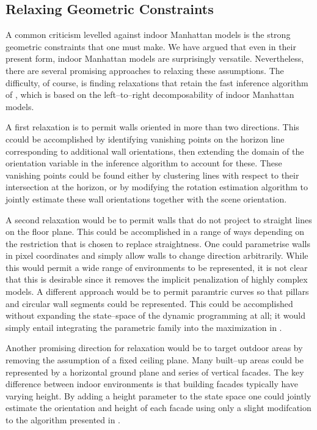 \subsection{Relaxing Geometric Constraints}

A common criticism levelled against indoor Manhattan models is the
strong geometric constraints that one must make. We have argued that
even in their present form, indoor Manhattan models are surprisingly
versatile. Nevertheless, there are several promising approaches to
relaxing these assumptions. The difficulty, of course, is finding
relaxations that retain the fast inference algorithm of
, which is based on the left--to--right
decomposability of indoor Manhattan models.

A first relaxation is to permit walls oriented in more than two
directions. This ccould be accomplished by identifying vanishing
points on the horizon line corresponding to additional wall
orientations, then extending the domain of the orientation variable in
the inference algorithm to account for these. These vanishing points
could be found either by clustering lines with respect to their
intersection at the horizon, or by modifying the rotation estimation
algorithm to jointly estimate these wall orientations together with
the scene orientation.

A second relaxation would be to permit walls that do not project to
straight lines on the floor plane. This could be accomplished in a
range of ways depending on the restriction that is chosen to replace
straightness. One could parametrise walls in pixel coordinates and
simply allow walls to change direction arbitrarily. While this would
permit a wide range of environments to be represented, it is not clear
that this is desirable since it removes the implicit penalization of
highly complex models. A different approach would be to permit
paramtric curves so that pillars and circular wall segments could be
represented. This could be accomplished without expanding the
state--space of the dynamic programming at all; it would simply entail
integrating the parametric family into the maximization in
.

Another promising direction for relaxation would be to target outdoor
areas by removing the assumption of a fixed ceiling plane. Many
built--up areas could be represented by a horizontal ground plane and
series of vertical facades. The key difference between indoor
environments is that building facades typically have varying
height. By adding a height parameter to the state space one could
jointly estimate the orientation and height of each facade using only
a slight modifcation to the algorithm presented in
.

